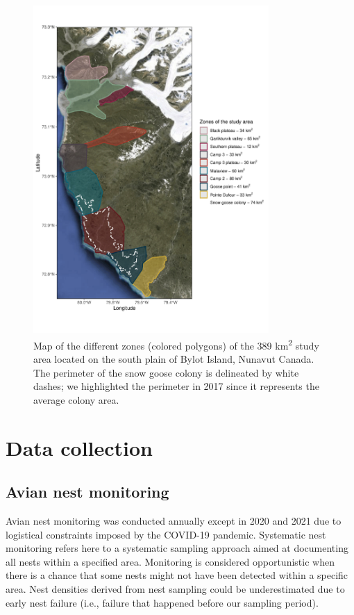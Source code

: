 \documentclass[a4paper,twoside,10pt]{article}
\begin{document}
\begin{figure}
\centering
  \includegraphics[width=0.8\textwidth, angle=0]{figures/zones_study_area.pdf}
   \vspace{-35pt} %
   \caption{Map of the different zones (colored polygons) of the 389 km\textsuperscript{2} study area located on the south plain of Bylot Island, Nunavut Canada. The perimeter of the snow goose colony is delineated by white dashes; we highlighted the perimeter in 2017 since it represents the average colony area.}
  \label{figure:zones}
\end{figure}
\newpage



\newpage

\section{Data collection}
\subsection{Avian nest monitoring}
Avian nest monitoring was conducted annually except in 2020 and 2021 due to logistical constraints imposed by the COVID-19 pandemic. Systematic nest monitoring refers here to a systematic sampling approach aimed at documenting all nests within a specified area. Monitoring is considered opportunistic when there is a chance that some nests might not have been detected within a specific area. Nest densities derived from nest sampling could be underestimated due to early nest failure (i.e., failure that happened before our sampling period).
\end{document}
